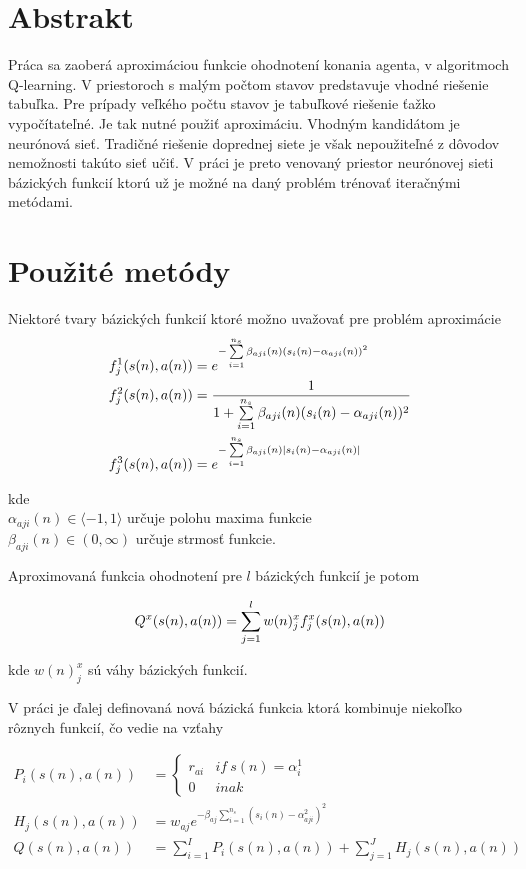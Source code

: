 \section{Abstrakt}

Práca sa zaoberá aproximáciou funkcie ohodnotení konania agenta, v algoritmoch Q-learning.
V priestoroch s malým počtom stavov predstavuje vhodné riešenie tabuľka.
Pre prípady veľkého počtu stavov je tabuľkové riešenie ťažko vypočítateľné. Je tak nutné použiť
aproximáciu. Vhodným kandidátom je neurónová sieť. Tradičné riešenie doprednej
siete je však nepoužiteľné z dôvodov nemožnosti takúto sieť učiť. V práci
je preto venovaný priestor neurónovej sieti bázických funkcií ktorú už je možné
na daný problém trénovať iteračnými metódami.

\section{Použité metódy}

Niektoré tvary bázických funkcií ktoré možno uvažovať pre problém aproximácie
\begin{align}
    f_j^1(\boldmath{s(n), a(n)}) &= e^{ -\sum\limits_{i=1}^{n_s}{\beta_{aji}(n)(s_i(n) - \alpha_{aji}(n))^2} }  \\
    f_j^2(\boldmath{s(n), a(n)}) &= \frac{1}{1 + \sum\limits_{i=1}^{n_s}{\beta_{aji}(n)(s_i(n) - \alpha_{aji}(n))^2}}  \\
    f_j^3(\boldmath{s(n), a(n)}) &= e^{ -\sum\limits_{i=1}^{n_s}{\beta_{aji}(n)\mid s_i(n) - \alpha_{aji}(n) \mid} }
    \label{eq:basis_functions_01}
\end{align}

kde \\
$\alpha_{aji}(n) \in \langle -1, 1 \rangle$ určuje polohu maxima funkcie \\
$\beta_{aji}(n) \in (0, \infty)$ určuje strmosť funkcie.

Aproximovaná funkcia ohodnotení pre $l$ bázických funkcií je potom

\begin{align}
Q^x(s(n), a(n)) = \sum\limits_{j=1}^{l} w(n)_j^x f_j^x(\boldmath{s(n), a(n)})
\label{eq:knn_y_update}
\end{align}

kde $w(n)_j^x$ sú váhy bázických funkcií.


V práci je ďalej definovaná nová bázická funkcia ktorá kombinuje niekoľko rôznych funkcií,
čo vedie na vzťahy

\begin{align}
P_i(s(n), a(n)) &=
\left\{
	\begin{array}{ll}
		r_{ai}  & if \ s(n) = \alpha^1_i \\
		0 & inak
	\end{array}
\right. \\
  H_j(s(n), a(n)) &= w_{aj} e^{ -\beta_{aj} \sum\limits_{i=1}^{n_s}{(s_i(n) - \alpha^2_{aji})^2 }} \\
  Q(s(n), a(n)) &= \sum\limits_{i=1}^{I} P_i(s(n),a(n)) + \sum\limits_{j=1}^{J} H_j(s(n), a(n))
  \label{eq:peak_hill}
\end{align}


